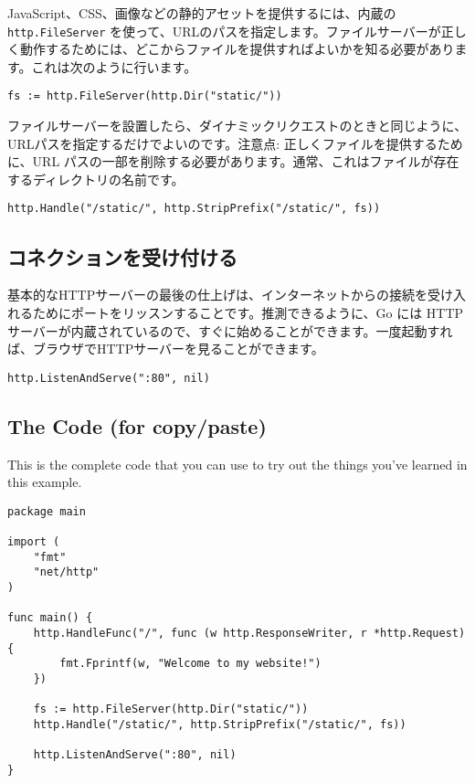 JavaScript、CSS、画像などの静的アセットを提供するには、内蔵の \texttt{http.FileServer} を使って、URLのパスを指定します。ファイルサーバーが正しく動作するためには、どこからファイルを提供すればよいかを知る必要があります。これは次のように行います。

\begin{lstlisting}[numbers=none]
fs := http.FileServer(http.Dir("static/"))
\end{lstlisting}

ファイルサーバーを設置したら、ダイナミックリクエストのときと同じように、URLパスを指定するだけでよいのです。注意点: 正しくファイルを提供するために、URL パスの一部を削除する必要があります。通常、これはファイルが存在するディレクトリの名前です。


\begin{lstlisting}[numbers=none]
http.Handle("/static/", http.StripPrefix("/static/", fs))
\end{lstlisting}

\subsection{コネクションを受け付ける}

基本的なHTTPサーバーの最後の仕上げは、インターネットからの接続を受け入れるためにポートをリッスンすることです。推測できるように、Go には HTTP サーバーが内蔵されているので、すぐに始めることができます。一度起動すれば、ブラウザでHTTPサーバーを見ることができます。

\begin{lstlisting}[numbers=none]
http.ListenAndServe(":80", nil)
\end{lstlisting}

\subsection{The Code (for copy/paste)}

This is the complete code that you can use to try out the things you’ve learned in this example.

\begin{lstlisting}[numbers=none]
package main

import (
    "fmt"
    "net/http"
)

func main() {
    http.HandleFunc("/", func (w http.ResponseWriter, r *http.Request) {
        fmt.Fprintf(w, "Welcome to my website!")
    })

    fs := http.FileServer(http.Dir("static/"))
    http.Handle("/static/", http.StripPrefix("/static/", fs))

    http.ListenAndServe(":80", nil)
}
\end{lstlisting}





